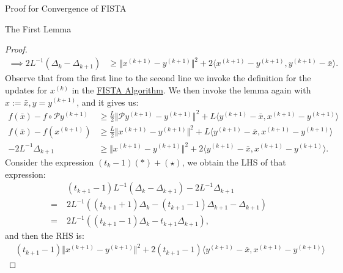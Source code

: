 \documentclass[]{article}
\theoremstyle{definition}
\begin{document}
\begin{section}{Proof for Convergence of FISTA}
\begin{subsection}{The First Lemma}
\begin{proof}
\begin{align*}
                \implies
                2L^{-1} (\Delta_k - \Delta_{k + 1}) 
                & \ge 
                \Vert x^{(k + 1)} - y^{(k + 1)}\Vert^2 + 
                2\langle x^{(k + 1)} - y^{(k + 1)}, y^{(k + 1)} - \bar x\rangle. 
                \tag{$*$}
            \end{align*}
            Observe that from the first line to the second line we invoke the definition for the updates for $x^{(k)}$ in the \hyperref[alg:fista_1]{FISTA Algorithm}. We then invoke the lemma again with $x:= \bar x, y = y^{(k + 1)}$, and it gives us: 
            \begin{align*}
                f(\bar x) - f\circ \mathcal P y^{(k + 1)}
                & \ge 
                \frac{L}{2}\Vert \mathcal P y^{(k + 1)} - y^{(k + 1)}\Vert^2 
                + L 
                \langle y^{(k + 1)} - \bar x, x^{(k + 1)} - y^{(k + 1)}\rangle
                \\
                f(\bar x) - f(x^{(k + 1)}) 
                &\ge 
                \frac{L}{2}\Vert x^{(k + 1)} - y^{(k + 1)}\Vert^2
                + 
                L \langle y^{(k + 1)} - \bar x, x^{(k + 1)} - y^{(k + 1)}\rangle
                \\
                -2L^{-1}\Delta_{k + 1}
                & \ge
                \Vert x^{(k + 1)} - y^{(k + 1)}\Vert^2
                + 
                2\langle y^{(k + 1)} - \bar x, x^{(k + 1)} - y^{(k + 1)}\rangle. 
                \tag{$\star$}
            \end{align*}
            Consider the expression $(t_k - 1)(*) + (\star)$, we obtain the LHS of that expression: 
            \begin{align*}
                &(t_{k + 1} - 1)L^{-1} (\Delta_k - \Delta_{k + 1}) 
                -
                2L^{-1}\Delta_{k + 1}
                \\
                = \; &
                2L^{-1}
                ((t_{k + 1} + 1)\Delta_k - (t_{k + 1} - 1)\Delta_{k + 1} - \Delta_{k + 1})
                \\
                = \; &
                2L^{-1}((t_{k + 1} - 1)\Delta_k - t_{k + 1}\Delta_{k + 1}),
                \tag{$\star *$LHS}
            \end{align*}
            and then the RHS is: 
            \begin{align*}
                & (t_{k + 1} - 1)\Vert x^{(k + 1)} - y^{(k + 1)}\Vert^2
                + 
                2(t_{k + 1} - 1)\langle y^{(k + 1)} - \bar x, x^{(k + 1)} - y^{(k + 1)}\rangle 

\end{align*}
\end{proof}
\end{subsection}
\end{section}
\end{document}
